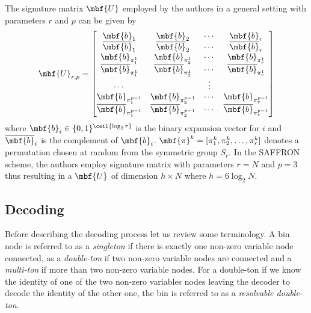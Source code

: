 \documentclass[conference,twocolumn]{IEEEtran}
\begin{document}
{The signature matrix $\mbf{U}$ employed by the authors in a general setting with parameters $r$ and $p$ can be given by
 \begin{align}
\label{Eqn:SignatureMatrix}
\mbf{U}_{r,p}=\begin{bmatrix}
\mbf{b}_1  & \mbf{b}_2 &\cdots & \mbf{b}_r \\
\overline{\mbf{b}}_1 & \overline{\mbf{b}}_2 & \cdots & \overline{\mbf{b}}_r\\
\mbf{b}_{\pi^{1}_{1}} & \mbf{b}_{\pi^{1}_{2}} & \cdots & \mbf{b}_{\pi^{1}_{r}}\\
\overline{\mbf{b}}_{\pi^{1}_{1}} & \overline{\mbf{b}}_{\pi^{1}_{2}} & \cdots & \overline{\mbf{b}}_{\pi^{1}_{r}}\\
\cdots &  &\vdots \\
\mbf{b}_{\pi^{p-1}_{1}} & \mbf{b}_{\pi^{p-1}_{2}} & \cdots & \mbf{b}_{\pi^{p-1}_{r}}\\
\overline{\mbf{b}}_{\pi^{p-1}_{1}} & \overline{\mbf{b}}_{\pi^{p-1}_{2}} & \cdots & \overline{\mbf{b}}_{\pi^{p-1}_{r}}
\end{bmatrix}
\end{align}
where $\mbf{b}_{i}\in\{0,1\}^{\ceil{\log_{2}r}}$ is the binary expansion vector for $i$ and $\overline{\mbf{b}}_{i}$ is the complement of $\mbf{b}_{i}$. $\mbf{\pi}^{k}=[\pi^{k}_1,\pi^{k}_2,\ldots,\pi^{k}_r]$ denotes a permutation chosen at random from the symmetric group $S_{r}$. In the SAFFRON scheme, the authors employ signature matrix with parameters $r=N$ and $p=3$ thus resulting in a $\mbf{U}$ of dimension $h \times N$ where $h=6\log_{2}N$.
\subsection*{Decoding}
Before describing the decoding process let us review some terminology. A bin node is referred to as a \textit{singleton} if there is exactly one non-zero variable node connected, as a \textit{double-ton} if two non-zero variable nodes are connected and a \textit{multi-ton} if more than two non-zero variable nodes. For a double-ton if we know the identity of one of the two non-zero variables nodes leaving the decoder to decode the identity of the other one, the bin is referred to as a \textit{resolvable double-ton}.

}
\end{document}
